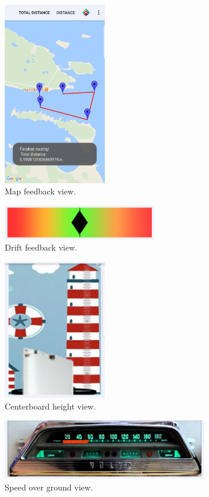 \begin{figure}[H]
	\centering
	\includegraphics[width=0.4\textwidth]{Figures/map.png}
	\caption{Map feedback view.}
	\label{feedback-map}
\end{figure}
\begin{figure}[H]
	\centering
	\includegraphics[width=0.6\textwidth]{Figures/drift.png}
	\caption{Drift feedback view.}
	\label{feedback-drift}
\end{figure}
\begin{figure}[H]
	\centering
	\includegraphics[width=0.4\textwidth]{Figures/height.png}
	\caption{Centerboard height view.}
	\label{feedback-height}
\end{figure}
\begin{figure}[H]
	\centering
	\includegraphics[width=0.8\textwidth]{Figures/sog.jpg}
	\caption{Speed over ground view.}
	\label{feedback-sog}
\end{figure}
